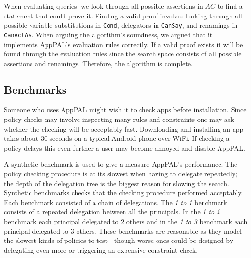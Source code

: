 \documentclass[thesis.tex]{subfiles}
\begin{document}
When evaluating queries, we look through all possible assertions in $AC$ to find
a statement that could prove it. Finding a valid proof involves looking through
all possible variable substitutions in \texttt{Cond}, delegators in
\texttt{CanSay}, and renamings in \texttt{CanActAs}. When arguing the
algorithm's soundness, we argued that it implements AppPAL's evaluation rules
correctly. If a valid proof exists it will be found through the evaluation rules
since the search space consists of all possible assertions and renamings.
Therefore, the algorithm is complete.

\subsection{Benchmarks}
\label{ssec:benchmarks}

Someone who uses AppPAL might wish it to check apps before installation. Since
policy checks may involve inspecting many rules and constraints one may ask
whether the checking will be acceptably fast. Downloading and installing an app
takes about 30 seconds on a typical Android phone over WiFi. If checking a
policy delays this even further a user may become annoyed and disable AppPAL.

A synthetic benchmark is used to give a measure AppPAL's performance. The policy
checking procedure is at its slowest when having to delegate repeatedly; the
depth of the delegation tree is the biggest reason for slowing the search.
Synthetic benchmarks checks that the checking procedure performed acceptably.
Each benchmark consisted of a chain of delegations. The \emph{1 to 1} benchmark
consists of a repeated delegation between all the principals. In the \emph{1 to
2} benchmark each principal delegated to 2 others and in the \emph{1 to 3}
benchmark each principal delegated to 3 others. These benchmarks are reasonable
as they model the slowest kinds of policies to test---though worse ones could be
designed by delegating even more or triggering an expensive constraint check.
\end{document}
